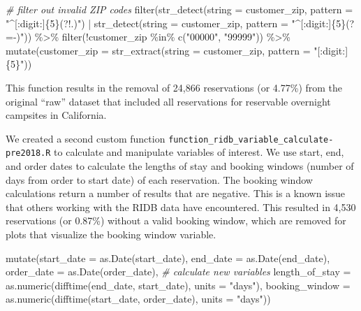 \documentclass[
  11 pt,
  openany]{book}
\newenvironment{Shaded}{\begin{snugshade}}{\end{snugshade}}
\newcommand{\AttributeTok}[1]{\textcolor[rgb]{0.77,0.63,0.00}{#1}}
\newcommand{\CommentTok}[1]{\textcolor[rgb]{0.56,0.35,0.01}{\textit{#1}}}
\newcommand{\FunctionTok}[1]{\textcolor[rgb]{0.00,0.00,0.00}{#1}}
\newcommand{\NormalTok}[1]{#1}
\newcommand{\SpecialCharTok}[1]{\textcolor[rgb]{0.00,0.00,0.00}{#1}}
\newcommand{\StringTok}[1]{\textcolor[rgb]{0.31,0.60,0.02}{#1}}
\begin{document}
\begin{Shaded}
\begin{Highlighting}[]
\CommentTok{\# filter out invalid ZIP codes}
\FunctionTok{filter}\NormalTok{(}\FunctionTok{str\_detect}\NormalTok{(}\AttributeTok{string =}\NormalTok{ customer\_zip,}
                  \AttributeTok{pattern =} \StringTok{"\^{}[:digit:]\{5\}(?!.)"}\NormalTok{) }\SpecialCharTok{|}
         \FunctionTok{str\_detect}\NormalTok{(}\AttributeTok{string =}\NormalTok{ customer\_zip,}
                    \AttributeTok{pattern =} \StringTok{"\^{}[:digit:]\{5\}(?={-})"}\NormalTok{)) }\SpecialCharTok{\%\textgreater{}\%}
  \FunctionTok{filter}\NormalTok{(}\SpecialCharTok{!}\NormalTok{customer\_zip }\SpecialCharTok{\%in\%} \FunctionTok{c}\NormalTok{(}\StringTok{"00000"}\NormalTok{, }\StringTok{"99999"}\NormalTok{)) }\SpecialCharTok{\%\textgreater{}\%}
  \FunctionTok{mutate}\NormalTok{(}\AttributeTok{customer\_zip =} \FunctionTok{str\_extract}\NormalTok{(}\AttributeTok{string =}\NormalTok{ customer\_zip,}
                                    \AttributeTok{pattern =} \StringTok{"[:digit:]\{5\}"}\NormalTok{))}
\end{Highlighting}
\end{Shaded}

This function results in the removal of 24,866 reservations (or 4.77\%) from the original ``raw'' dataset that included all reservations for reservable overnight campsites in California.

We created a second custom function \texttt{function\_ridb\_variable\_calculate-pre2018.R} to calculate and manipulate variables of interest. We use start, end, and order dates to calculate the lengths of stay and booking windows (number of days from order to start date) of each reservation. The booking window calculations return a number of results that are negative. This is a known issue that others working with the RIDB data have encountered. This resulted in 4,530 reservations (or 0.87\%) without a valid booking window, which are removed for plots that visualize the booking window variable.

\begin{Shaded}
\begin{Highlighting}[]
\FunctionTok{mutate}\NormalTok{(}\AttributeTok{start\_date =} \FunctionTok{as.Date}\NormalTok{(start\_date),}
       \AttributeTok{end\_date =} \FunctionTok{as.Date}\NormalTok{(end\_date),}
       \AttributeTok{order\_date =} \FunctionTok{as.Date}\NormalTok{(order\_date),}
       \CommentTok{\# calculate new variables}
       \AttributeTok{length\_of\_stay =} \FunctionTok{as.numeric}\NormalTok{(}\FunctionTok{difftime}\NormalTok{(end\_date, start\_date), }
                                   \AttributeTok{units =} \StringTok{"days"}\NormalTok{),}
       \AttributeTok{booking\_window =} \FunctionTok{as.numeric}\NormalTok{(}\FunctionTok{difftime}\NormalTok{(start\_date, order\_date), }
                                   \AttributeTok{units =} \StringTok{"days"}\NormalTok{))}
\end{Highlighting}
\end{Shaded}
\end{document}
